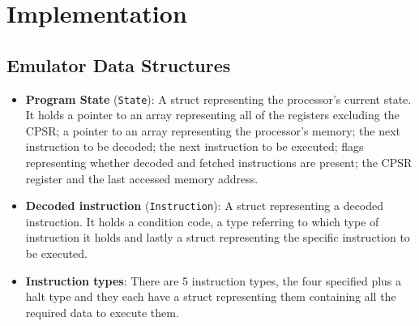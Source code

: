 \documentclass[8pt]{article}
\begin{document}
\section{Implementation}

\subsection{Emulator Data Structures}

\begin{itemize}

    \item \textbf{Program State} (\texttt{State}): A struct representing the 
    processor's current state. It holds a pointer to an array representing 
    all of the registers excluding the CPSR; a pointer to an array
    representing the processor's memory; the next instruction to be decoded; the 
    next instruction to be executed; flags representing whether decoded
    and fetched instructions are present; 
    the CPSR register and the last accessed memory address.
    
    \item \textbf{Decoded instruction} (\texttt{Instruction}): A struct representing
    a decoded instruction. It holds a condition code, a type referring to which type of 
    instruction it holds and lastly a struct representing the specific instruction to be executed.
    
    \item \textbf{Instruction types}: There are 5 instruction types, the four specified 
    plus a halt type and they each have a struct
    representing them containing all the required data to execute them.

    
    \end{itemize}
\end{document}
